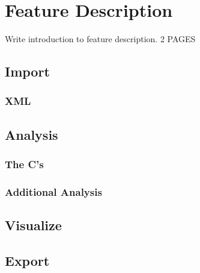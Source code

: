 \chapter{Feature Description}%

Write introduction to feature description. 2 PAGES

\section{Import}
\subsection{XML}
\section{Analysis}
\subsection{The C's}
\subsection{Additional Analysis}
\section{Visualize}
\section{Export}